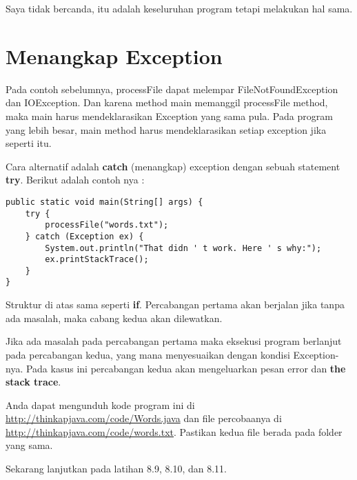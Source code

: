 Saya tidak bercanda, itu adalah keseluruhan program tetapi melakukan hal sama.

\section{Menangkap Exception}

Pada contoh sebelumnya, processFile dapat melempar FileNotFoundException dan IOException. Dan karena method main memanggil processFile method, maka main harus mendeklarasikan Exception yang sama pula. Pada program yang lebih besar, main method harus mendeklarasikan setiap exception jika seperti itu.

Cara alternatif adalah \textbf{catch} (menangkap) exception dengan sebuah statement \textbf{try}. Berikut adalah contoh nya : 

\begin{lstlisting}
public static void main(String[] args) {
	try {
		processFile("words.txt");
	} catch (Exception ex) {
		System.out.println("That didn ' t work. Here ' s why:");
		ex.printStackTrace();
	}
}
\end{lstlisting}

Struktur di atas sama seperti \textbf{if}. Percabangan pertama akan berjalan jika tanpa ada masalah, maka cabang kedua akan dilewatkan.

Jika ada masalah pada percabangan pertama maka eksekusi program berlanjut pada percabangan kedua, yang mana menyesuaikan dengan kondisi Exception-nya. Pada kasus ini percabangan kedua akan mengeluarkan pesan error dan \textbf{the stack trace}.

Anda dapat mengunduh kode program ini di \url{http://thinkapjava.com/code/Words.java} dan file percobaanya di \url{http://thinkapjava.com/code/words.txt}. Pastikan kedua file berada pada folder yang sama.

Sekarang lanjutkan pada latihan 8.9, 8.10, dan 8.11.